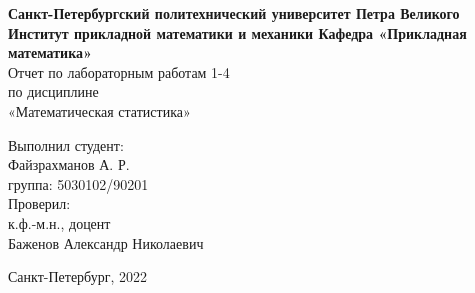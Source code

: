 \documentclass[oneside,final]{article}
\begin{document}
	\begin{titlepage}
		\newpage 
		\begin{center}
			{\bfseries Санкт-Петербургский политехнический университет
			Петра Великого \\
			Институт прикладной математики и механики
				Кафедра «Прикладная математика»\\}  
			\vfill
			\vfill
			\normalsize{Отчет по лабораторным работам 1-4\\
					по дисциплине\\
				«Математическая статистика»\\}   
			\vfill		                    
		\end{center}
		\begin{flushright}
		\begin{minipage}{.45\textwidth}
			\normalsize{Выполнил студент:\\
			Файзрахманов А. Р. \\
			группа: 5030102/90201}
			\break\hfill\break
			\\
			\normalsize{Проверил:\\
			к.ф.-м.н., доцент\\
			Баженов Александр Николаевич} 
		
\end{minipage}
		\end{flushright}
		\begin{center}
			\vfill
			\normalsize{Санкт-Петербург, 2022}
		\end{center}
	\end{titlepage}

	\tableofcontents
	\newpage
	\listoffigures
	\newpage
	\listoftables
	\newpage
	
	
\end{document}
